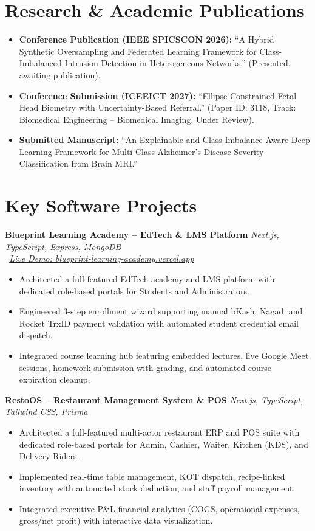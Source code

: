 \documentclass[11pt,letterpaper]{article}
\begin{document}
\section*{Research \& Academic Publications}
\begin{itemize}
    \item \textbf{Conference Publication (IEEE SPICSCON 2026):} ``A Hybrid Synthetic Oversampling and Federated Learning Framework for Class-Imbalanced Intrusion Detection in Heterogeneous Networks.'' (Presented, awaiting publication).
    \item \textbf{Conference Submission (ICEEICT 2027):} ``Ellipse-Constrained Fetal Head Biometry with Uncertainty-Based Referral.'' (Paper ID: 3118, Track: Biomedical Engineering -- Biomedical Imaging, Under Review).
    \item \textbf{Submitted Manuscript:} ``An Explainable and Class-Imbalance-Aware Deep Learning Framework for Multi-Class Alzheimer’s Disease Severity Classification from Brain MRI.'' 
\end{itemize}

\section*{Key Software Projects}

\noindent \textbf{Blueprint Learning Academy -- EdTech \& LMS Platform} \hfill \textit{Next.js, TypeScript, Express, MongoDB} \\
\textit{\small \faGlobe\ \href{https://blueprint-learning-academy.vercel.app}{Live Demo: blueprint-learning-academy.vercel.app}}
\begin{itemize}
    \item Architected a full-featured EdTech academy and LMS platform with dedicated role-based portals for Students and Administrators.
    \item Engineered 3-step enrollment wizard supporting manual bKash, Nagad, and Rocket TrxID payment validation with automated student credential email dispatch.
    \item Integrated course learning hub featuring embedded lectures, live Google Meet sessions, homework submission with grading, and automated course expiration cleanup.
\end{itemize}

\vspace{4pt}
\noindent \textbf{RestoOS -- Restaurant Management System \& POS} \hfill \textit{Next.js, TypeScript, Tailwind CSS, Prisma}
\begin{itemize}
    \item Architected a full-featured multi-actor restaurant ERP and POS suite with dedicated role-based portals for Admin, Cashier, Waiter, Kitchen (KDS), and Delivery Riders.
    \item Implemented real-time table management, KOT dispatch, recipe-linked inventory with automated stock deduction, and staff payroll management.
    \item Integrated executive P\&L financial analytics (COGS, operational expenses, gross/net profit) with interactive data visualization.
\end{itemize}
\end{document}
